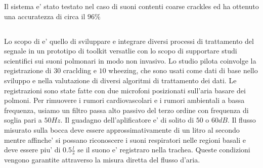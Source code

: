 Il sistema e' stato testato nel caso di suoni contenti coarse crackles ed ha ottenuto una accuratezza di circa il $96\%$

\subsection{\cite{TLSA}}

Lo scopo di \cite{TLSA} e' quello di sviluppare e integrare diversi processi di trattamento del segnale in un prototipo di toolkit versatlie con lo scopo di supportare studi scientifici sui suoni polmonari in modo non invasivo. Lo studio pilota coinvolge la registrazione di $30$ craclding e $10$ wheezing, che sono usati come dati di base nello sviluppo e nella valutazione di diversi algoritmi di trattamento dei dati. Le registrazioni sono state fatte con due microfoni posizionati sull'aria basare dei polmoni.
Per rimuovere i rumori cardiovascolari e i rumori ambientali a bassa frequenza, usiamo un filtro passa alto passivo del terzo ordine con frequenza di soglia pari a $50Hz$. Il guadagno dell'aplificatore e' di solito di $50$ o $60dB$. Il flusso misurato sulla bocca deve essere approssimativamente di un litro al secondo mentre affinche' si possano riconoscere i suoni respiratori nelle regioni basali e deve essere piu' di $0.5\frac{l}{s}$ se il suono e' registraro nella trachea. Queste condizioni vengono garantite attraverso la misura diretta del flusso d'aria.
